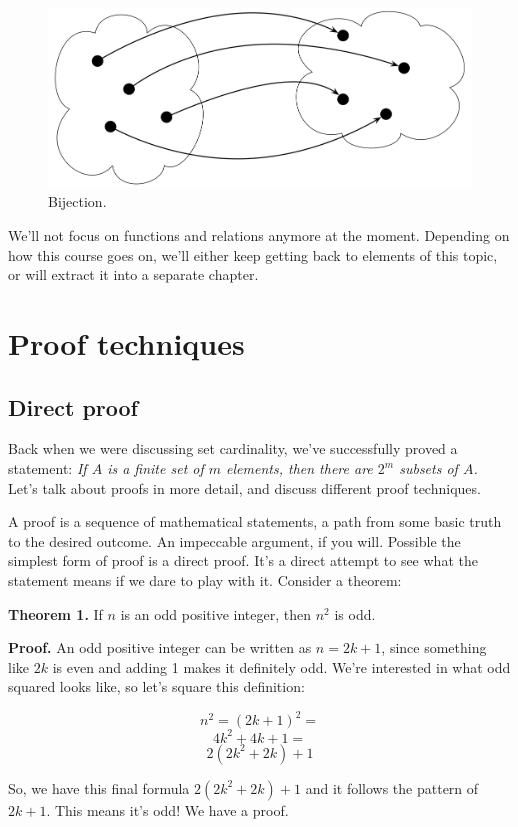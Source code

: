 \documentclass[12pt, a4paper, justified, notitlepage, sfsidenotes, notoc]{book}
\begin{document}
\begin{figure}
  \includegraphics[width=.5\linewidth,right]{images/relations/bijection.png}
  \caption{Bijection.}
  \label{fig:bijection}
\end{figure}

We'll not focus on functions and relations anymore at the moment. Depending on how this course goes on, we'll either keep getting back to elements of this topic, or will extract it into a separate chapter.

\chapter{Proof techniques}
\label{sec:org5101666}

\section{Direct proof}
\label{sec:org39679d2}

Back when we were discussing set cardinality, we've successfully proved a statement: \emph{If \(A\) is a finite set of \(m\) elements, then there are \(2^{m}\) subsets of \(A\).} Let's talk about proofs in more detail, and discuss different proof techniques.

A proof is a sequence of mathematical statements, a path from some basic truth to the desired outcome. An impeccable argument, if you will. Possible the simplest form of proof is a direct proof. It's a direct attempt to see what the statement means if we dare to play with it. Consider a theorem:

\textbf{Theorem 1.} If \(n\) is an odd positive integer, then \(n^2\) is odd.

\textbf{Proof.} An odd positive integer can be written as \(n = 2k + 1\), since something like \(2k\) is even and adding 1 makes it definitely odd. We're interested in what odd squared looks like, so let's square this definition:

$$ n^2 = (2k + 1)^2 = $$
$$ 4k^2 + 4k + 1 = $$
$$ 2(2k^2 + 2k) + 1 $$

So, we have this final formula \(2(2k^2 + 2k) + 1\) and it follows the pattern of \(2k + 1\). This means it's odd! We have a proof.
\end{document}
